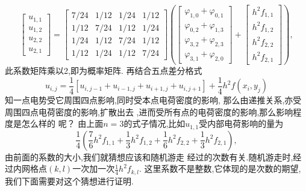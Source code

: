\documentclass[UTF8,a4paper,notitlepage]{ctexart}%
\theoremstyle{nonumberplain}
\begin{document}
\begin{equation}
    \begin{bmatrix}
        u_{1,1}\\
        u_{1,2}\\
        u_{2,2}\\
        u_{2,1}
    \end{bmatrix}
=\begin{bmatrix}
    7/24 & 1/12 & 1/24 & 1/12\\
    1/12 & 7/24 & 1/12 & 1/24\\
    1/24 & 1/12 & 7/24 & 1/12\\
    1/12 & 1/24 & 1/12 & 7/24
\end{bmatrix}
\left(
    \begin{bmatrix}
        \varphi _{1,0}+\varphi _{0,1}\\
        \varphi _{0,2}+\varphi _{1,3}\\
        \varphi _{3,2}+\varphi _{2,3}\\
        \varphi _{3,1}+\varphi _{2,0}
    \end{bmatrix}
    +
    \begin{bmatrix}
        h^2f_{1,1}\\
                h^2f_{1,2}\\
                h^2f_{2,2}\\
                h^2f_{2,1}
    \end{bmatrix}
\right) ,\nonumber
\end{equation}
此系数矩阵乘以2,即为概率矩阵.
再结合五点差分格式
\begin{equation}
    u_{i,j}=\frac{1}{4}[u_{i,j-1}+u_{i-1,j}+u_{i+1,j}+u_{i,j+1}]
    +\frac{1}{4}h^2f(x_i,y_j)\nonumber
\end{equation}
知一点电势受它周围四点影响,同时受本点电荷密度的影响,
那么由递推关系,亦受周围四点电荷密度的影响,扩散出去
,进而受所有点的电荷密度的影响,那么影响程度是怎么样的
呢？
由上面$n=3$的式子情况,比如$u_{1,1}$受内部电荷影响的量为
\begin{equation}
    \frac{1}{4}\left(
        \frac{7}{6}h^2f_{1,1}+
        \frac{1}{3}h^2f_{1,2}+
        \frac{1}{6}h^2f_{2,2}+
        \frac{1}{3}h^2f_{2,1}
    \right) ,
\nonumber
\end{equation}
由前面的系数的大小,我们就猜想应该和随机游走
经过的次数有关.随机游走时,经过内网格点$(k,l)$一次加一次$\frac{1}{4}h^2f_{k,l}$.
这里系数不是整数,它体现的是次数的期望,我们下面需要对这个猜想进行证明.\\
\end{document}
